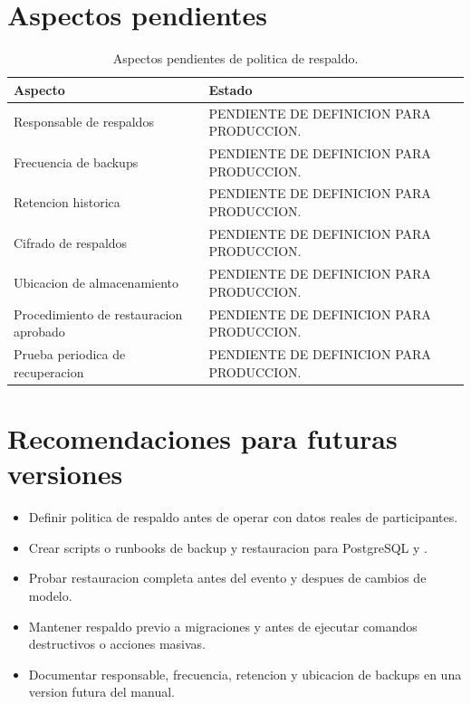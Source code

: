 \section{Aspectos pendientes}
\label{sec:respaldo-pendientes}

\begin{longtable}{p{4.8cm}p{7.4cm}}
\caption{Aspectos pendientes de politica de respaldo.}
\label{tab:respaldo-pendientes}\\
\toprule
Aspecto & Estado \\
\midrule
Responsable de respaldos & PENDIENTE DE DEFINICION PARA PRODUCCION. \\
Frecuencia de backups & PENDIENTE DE DEFINICION PARA PRODUCCION. \\
Retencion historica & PENDIENTE DE DEFINICION PARA PRODUCCION. \\
Cifrado de respaldos & PENDIENTE DE DEFINICION PARA PRODUCCION. \\
Ubicacion de almacenamiento & PENDIENTE DE DEFINICION PARA PRODUCCION. \\
Procedimiento de restauracion aprobado & PENDIENTE DE DEFINICION PARA PRODUCCION. \\
Prueba periodica de recuperacion & PENDIENTE DE DEFINICION PARA PRODUCCION. \\
\bottomrule
\end{longtable}

\section{Recomendaciones para futuras versiones}
\label{sec:respaldo-recomendaciones}

\begin{itemize}
  \item Definir politica de respaldo antes de operar con datos reales de participantes.
  \item Crear scripts o runbooks de backup y restauracion para PostgreSQL y .
  \item Probar restauracion completa antes del evento y despues de cambios de modelo.
  \item Mantener respaldo previo a migraciones y antes de ejecutar comandos destructivos o acciones masivas.
  \item Documentar responsable, frecuencia, retencion y ubicacion de backups en una version futura del manual.
\end{itemize}

